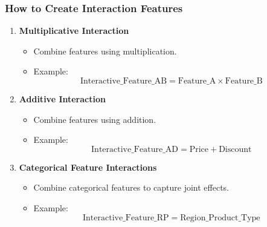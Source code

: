\documentclass[aspectratio=169]{beamer}
\begin{document}
\begin{frame}[fragile]
  \frametitle{How to Create Interaction Features}
  \begin{enumerate}
    \item \textbf{Multiplicative Interaction}
      \begin{itemize}
        \item Combine features using multiplication.
        \item Example: 
        \begin{equation}
          \text{Interactive\_Feature\_AB} = \text{Feature\_A} \times \text{Feature\_B}
        \end{equation}
      \end{itemize}
    
    \item \textbf{Additive Interaction}
      \begin{itemize}
        \item Combine features using addition.
        \item Example:
        \begin{equation}
          \text{Interactive\_Feature\_AD} = \text{Price} + \text{Discount}
        \end{equation}
      \end{itemize}
    
    \item \textbf{Categorical Feature Interactions}
      \begin{itemize}
        \item Combine categorical features to capture joint effects.
        \item Example:
        \begin{equation}
          \text{Interactive\_Feature\_RP} = \text{Region}\_\text{Product\_Type}
        \end{equation}
      \end{itemize}
  \end{enumerate}
\end{frame}
\end{document}
